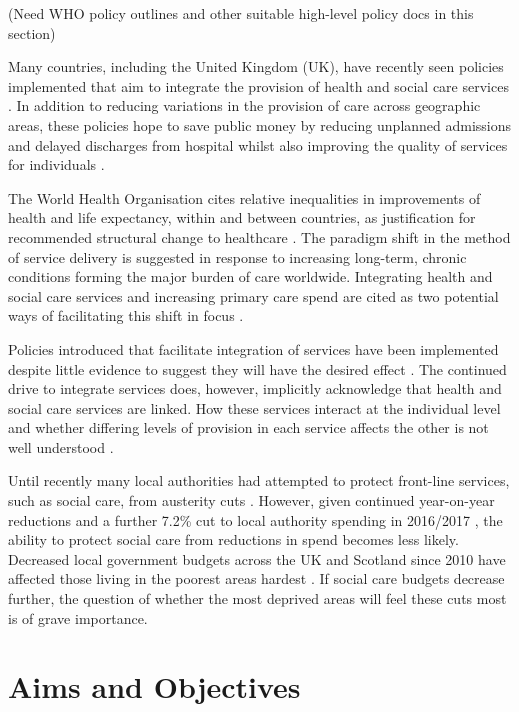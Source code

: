\documentclass[12pt,]{report}
\begin{document}
(Need WHO policy outlines and other suitable high-level policy docs in
this section)

Many countries, including the United Kingdom (UK), have recently seen
policies implemented that aim to integrate the provision of health and
social care services \citep{RN234, RN362, RN262}. In addition to
reducing variations in the provision of care across geographic areas,
these policies hope to save public money by reducing unplanned
admissions and delayed discharges from hospital whilst also improving
the quality of services for individuals \citep{RN232, RN266, RN406}.

The World Health Organisation \citeyearpar{RN320} cites relative
inequalities in improvements of health and life expectancy, within and
between countries, as justification for recommended structural change to
healthcare \citep{RN320}. The paradigm shift in the method of service
delivery is suggested in response to increasing long-term, chronic
conditions forming the major burden of care worldwide. Integrating
health and social care services and increasing primary care spend are
cited as two potential ways of facilitating this shift in focus
\citep{RN320}.

Policies introduced that facilitate integration of services have been
implemented despite little evidence to suggest they will have the
desired effect
\citep{RN367, RN369, RN234, RN233, RN321, RN362, RN366, RN260}. The
continued drive to integrate services does, however, implicitly
acknowledge that health and social care services are linked. How these
services interact at the individual level and whether differing levels
of provision in each service affects the other is not well understood
\citep{RN361, RN205, RN406}.

Until recently many local authorities had attempted to protect
front-line services, such as social care, from austerity cuts
\citep{RN117}. However, given continued year-on-year reductions and a
further 7.2\% cut to local authority spending in 2016/2017
\citep{RN251}, the ability to protect social care from reductions in
spend becomes less likely. Decreased local government budgets across the
UK and Scotland since 2010 have affected those living in the poorest
areas hardest \citep{RN117, RN235}. If social care budgets decrease
further, the question of whether the most deprived areas will feel these
cuts most is of grave importance.

\section{Aims and Objectives}\label{sec:intro-aims-and-obs}
\end{document}
